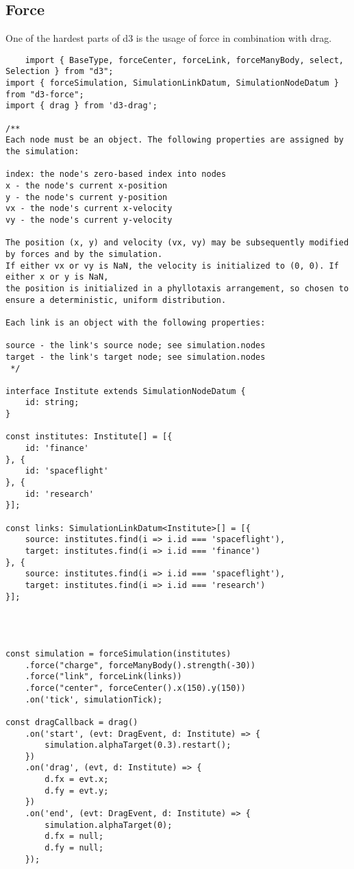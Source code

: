 \subsection{Force}
One of the hardest parts of d3 is the usage of force in combination with drag.
\begin{lstlisting}
    import { BaseType, forceCenter, forceLink, forceManyBody, select, Selection } from "d3";
import { forceSimulation, SimulationLinkDatum, SimulationNodeDatum } from "d3-force";
import { drag } from 'd3-drag';

/**
Each node must be an object. The following properties are assigned by the simulation:

index: the node's zero-based index into nodes
x - the node's current x-position
y - the node's current y-position
vx - the node's current x-velocity
vy - the node's current y-velocity

The position (x, y) and velocity (vx, vy) may be subsequently modified by forces and by the simulation.
If either vx or vy is NaN, the velocity is initialized to (0, 0). If either x or y is NaN,
the position is initialized in a phyllotaxis arrangement, so chosen to ensure a deterministic, uniform distribution.

Each link is an object with the following properties:

source - the link's source node; see simulation.nodes
target - the link's target node; see simulation.nodes
 */

interface Institute extends SimulationNodeDatum {
    id: string;
}

const institutes: Institute[] = [{
    id: 'finance'
}, {
    id: 'spaceflight'
}, {
    id: 'research'
}];

const links: SimulationLinkDatum<Institute>[] = [{
    source: institutes.find(i => i.id === 'spaceflight'),
    target: institutes.find(i => i.id === 'finance')
}, {
    source: institutes.find(i => i.id === 'spaceflight'),
    target: institutes.find(i => i.id === 'research')
}];




const simulation = forceSimulation(institutes)
    .force("charge", forceManyBody().strength(-30))
    .force("link", forceLink(links))
    .force("center", forceCenter().x(150).y(150))
    .on('tick', simulationTick);

const dragCallback = drag()
    .on('start', (evt: DragEvent, d: Institute) => {
        simulation.alphaTarget(0.3).restart(); 
    })
    .on('drag', (evt, d: Institute) => {
        d.fx = evt.x;
        d.fy = evt.y;
    })
    .on('end', (evt: DragEvent, d: Institute) => {
        simulation.alphaTarget(0);
        d.fx = null;
        d.fy = null;
    });



\end{lstlisting}

